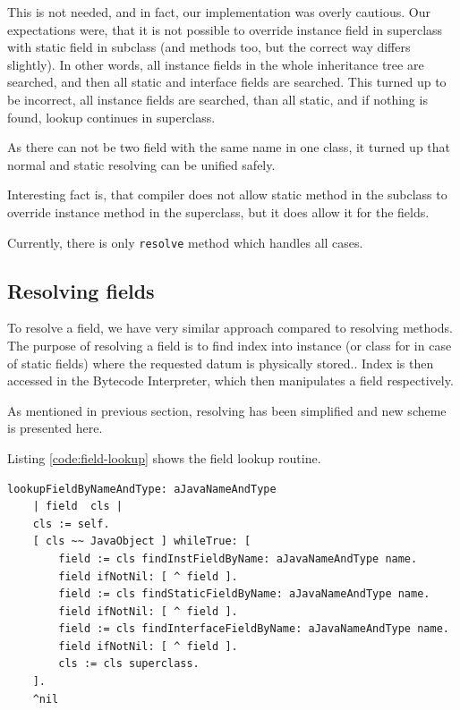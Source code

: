 \documentclass[11pt,twoside,a4paper]{book}
\begin{document}
This is not needed, and in fact, our implementation was overly cautious.
Our expectations were, that it is not possible to override instance field in superclass with static field in subclass (and methods too, but the correct way differs slightly). 
In other words, all instance fields in the whole inheritance tree are searched, and then all static and interface fields are searched.
This turned up to be incorrect, all instance fields are searched, than all static, and if nothing is found, lookup continues in superclass.

As there can not be two field with the same name in one class, it turned up that normal and static resolving can be unified
safely.

Interesting fact is, that compiler does not allow static method in the subclass to override instance method in the superclass, but it does allow it for the fields.

Currently, there is only \texttt{resolve} method which handles all cases.

\subsection{Resolving fields}
\label{sec:resolving_fields}

To resolve a field, we have very similar approach compared to resolving methods. 
The purpose of resolving a field is to find index into instance (or class for in case of static fields) where the requested
datum is physically stored..
Index is then accessed in the Bytecode Interpreter, which then manipulates a field respectively.

As mentioned in previous section, resolving has been simplified and new scheme is presented here.

Listing \ref{code:field-lookup} shows the field lookup routine. 

\begin{lstlisting}[caption=Field lookup algorithm, label=code:field-lookup]
lookupFieldByNameAndType: aJavaNameAndType 
    | field  cls |
    cls := self.
    [ cls ~~ JavaObject ] whileTrue: [
        field := cls findInstFieldByName: aJavaNameAndType name.
        field ifNotNil: [ ^ field ].
        field := cls findStaticFieldByName: aJavaNameAndType name.
        field ifNotNil: [ ^ field ].
        field := cls findInterfaceFieldByName: aJavaNameAndType name.
        field ifNotNil: [ ^ field ].
        cls := cls superclass.
    ].
	^nil
\end{lstlisting}
\end{document}
